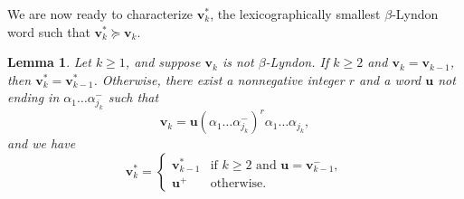\documentclass[11pt]{amsart}
\newtheorem{lemma}[theorem]{Lemma}
\theoremstyle{definition}
\theoremstyle{remark}
\numberwithin{equation}{section}
\renewcommand{\u}{\mathbf{u}}
\renewcommand{\v}{\mathbf{v}}
\newcommand{\al}{\alpha}
\newcommand{\lge}{\succcurlyeq}
\begin{document}
We are now ready to characterize $\v_k^*$, the lexicographically smallest $\beta$-Lyndon word such that $\v_k^*\lge \v_k$.

\begin{lemma} \label{lem:v_k-star}
Let $k\geq 1$, and suppose $\v_k$ is not $\beta$-Lyndon. If $k\geq 2$ and $\v_k=\v_{k-1}$, then $\v_k^*=\v_{k-1}^*$. Otherwise, there exist a nonnegative integer $r$ and a word $\u$ not ending in $\al_1\dots\al_{j_k}^-$ such that
\begin{equation} \label{eq:v_k-expression}
\v_k=\u(\al_1\dots\al_{j_k}^-)^r\al_1\dots\al_{j_k},
\end{equation}
and we have
\begin{equation} \label{eq:v_k-star}
\v_k^*=\begin{cases}
\v_{k-1}^* & \mbox{if $k\geq 2$ and $\u=\v_{k-1}^-$},\\
\u^+ & \mbox{otherwise}.
\end{cases}
\end{equation}
\end{lemma}
\end{document}
